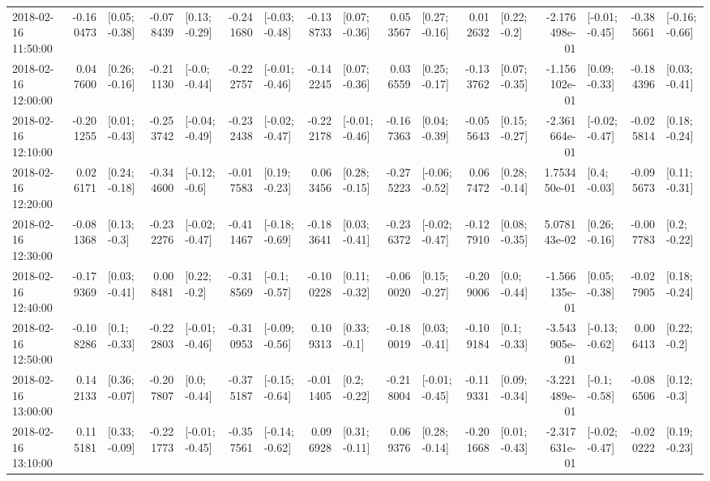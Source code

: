 \begin{tabular}{lrlrlrlrlrlrlrlrl}
2018-02-16 11:50:00 & -0.160473 &   [0.05; -0.38] & -0.078439 &   [0.13; -0.29] & -0.241680 &  [-0.03; -0.48] & -0.138733 &   [0.07; -0.36] &  0.053567 &   [0.27; -0.16] &  0.012632 &    [0.22; -0.2] & -2.176498e-01 &  [-0.01; -0.45] & -0.385661 &  [-0.16; -0.66] \\
2018-02-16 12:00:00 &  0.047600 &   [0.26; -0.16] & -0.211130 &   [-0.0; -0.44] & -0.222757 &  [-0.01; -0.46] & -0.142245 &   [0.07; -0.36] &  0.036559 &   [0.25; -0.17] & -0.133762 &   [0.07; -0.35] & -1.156102e-01 &   [0.09; -0.33] & -0.184396 &   [0.03; -0.41] \\
2018-02-16 12:10:00 & -0.201255 &   [0.01; -0.43] & -0.253742 &  [-0.04; -0.49] & -0.232438 &  [-0.02; -0.47] & -0.222178 &  [-0.01; -0.46] & -0.167363 &   [0.04; -0.39] & -0.055643 &   [0.15; -0.27] & -2.361664e-01 &  [-0.02; -0.47] & -0.025814 &   [0.18; -0.24] \\
2018-02-16 12:20:00 &  0.026171 &   [0.24; -0.18] & -0.344600 &   [-0.12; -0.6] & -0.017583 &   [0.19; -0.23] &  0.063456 &   [0.28; -0.15] & -0.275223 &  [-0.06; -0.52] &  0.067472 &   [0.28; -0.14] &  1.753450e-01 &    [0.4; -0.03] & -0.095673 &   [0.11; -0.31] \\
2018-02-16 12:30:00 & -0.081368 &    [0.13; -0.3] & -0.232276 &  [-0.02; -0.47] & -0.411467 &  [-0.18; -0.69] & -0.183641 &   [0.03; -0.41] & -0.236372 &  [-0.02; -0.47] & -0.127910 &   [0.08; -0.35] &  5.078143e-02 &   [0.26; -0.16] & -0.007783 &    [0.2; -0.22] \\
2018-02-16 12:40:00 & -0.179369 &   [0.03; -0.41] &  0.008481 &    [0.22; -0.2] & -0.318569 &   [-0.1; -0.57] & -0.100228 &   [0.11; -0.32] & -0.060020 &   [0.15; -0.27] & -0.209006 &    [0.0; -0.44] & -1.566135e-01 &   [0.05; -0.38] & -0.027905 &   [0.18; -0.24] \\
2018-02-16 12:50:00 & -0.108286 &    [0.1; -0.33] & -0.222803 &  [-0.01; -0.46] & -0.310953 &  [-0.09; -0.56] &  0.109313 &    [0.33; -0.1] & -0.180019 &   [0.03; -0.41] & -0.109184 &    [0.1; -0.33] & -3.543905e-01 &  [-0.13; -0.62] &  0.006413 &    [0.22; -0.2] \\
2018-02-16 13:00:00 &  0.142133 &   [0.36; -0.07] & -0.207807 &    [0.0; -0.44] & -0.375187 &  [-0.15; -0.64] & -0.011405 &    [0.2; -0.22] & -0.218004 &  [-0.01; -0.45] & -0.119331 &   [0.09; -0.34] & -3.221489e-01 &   [-0.1; -0.58] & -0.086506 &    [0.12; -0.3] \\
2018-02-16 13:10:00 &  0.115181 &   [0.33; -0.09] & -0.221773 &  [-0.01; -0.45] & -0.357561 &  [-0.14; -0.62] &  0.096928 &   [0.31; -0.11] &  0.069376 &   [0.28; -0.14] & -0.201668 &   [0.01; -0.43] & -2.317631e-01 &  [-0.02; -0.47] & -0.020222 &   [0.19; -0.23] \\

\end{tabular}
